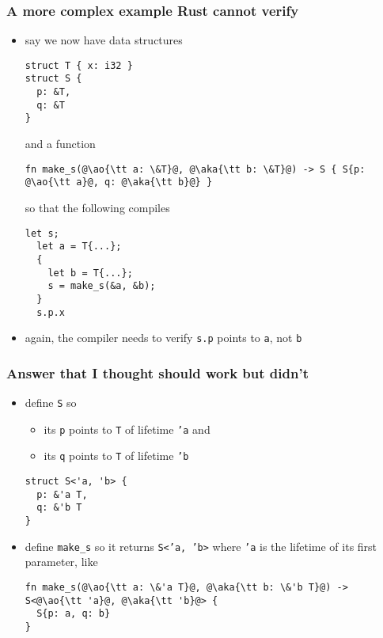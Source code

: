 \documentclass[12pt,dvipdfmx]{beamer}
\newcommand{\ao}[1]{{\color{blue}#1}}
\newcommand{\aka}[1]{{\color{red}#1}}
\begin{document}
\begin{frame}[fragile]
  \frametitle{A more complex example Rust cannot verify}
  \begin{itemize}
  \item say we now have data structures
\begin{lstlisting}[basicstyle=\ttfamily\tiny]
struct T { x: i32 }
struct S {
  p: &T,
  q: &T
}    
\end{lstlisting}
and a function 
\begin{lstlisting}[basicstyle=\ttfamily\tiny]
fn make_s(@\ao{\tt a: \&T}@, @\aka{\tt b: \&T}@) -> S { S{p: @\ao{\tt a}@, q: @\aka{\tt b}@} }
\end{lstlisting}
so that the following compiles
\begin{lstlisting}[basicstyle=\ttfamily\tiny]
  let s;
  let a = T{...};
  {
    let b = T{...};
    s = make_s(&a, &b);
  }
  s.p.x
\end{lstlisting}
\item again, the compiler needs to verify {\tt s.p} points to {\tt a}, not {\tt b}
\end{itemize}
\end{frame}

\begin{frame}[fragile]
  \frametitle{Answer that I thought should work but didn't}
  \begin{itemize}
  \item define {\tt S} so
    \begin{itemize}
    \item its {\tt p} points to {\tt T} of lifetime {\tt 'a} and
    \item its {\tt q} points to {\tt T} of lifetime {\tt 'b}
    \end{itemize}
\begin{lstlisting}
struct S<'a, 'b> {
  p: &'a T,
  q: &'b T
}    
\end{lstlisting}
\item define {\tt make\_s} so it returns {\tt S<'a, 'b>}
  where {\tt 'a} is the lifetime of its first parameter, like
\begin{lstlisting}
fn make_s(@\ao{\tt a: \&'a T}@, @\aka{\tt b: \&'b T}@) -> S<@\ao{\tt 'a}@, @\aka{\tt 'b}@> {
  S{p: a, q: b}
}    
\end{lstlisting}
\end{itemize}
\end{frame}
\end{document}
